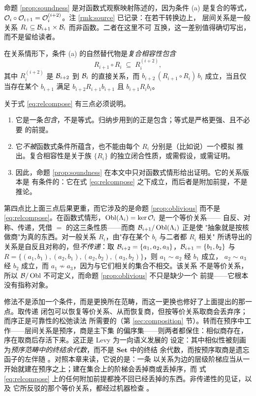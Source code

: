 \begin{remark}[关系情形下的条件 (a)]\label{rmk:relational-compose}
命题 \ref{prop:soundness} 是对函数式观察映射陈述的，因为条件 (a) 是复合的等式，
$\mathcal{O}_i \circ \mathcal{O}_{i+1} = \mathcal{O}_i^{(i+2)}$。注 \ref{rmk:source} 已记录：在若干转换边上，
层间关系是一般关系 $R_i \subseteq \mathcal{B}_{i+1} \times \mathcal{B}_i$ 而非函数。二者在这里不可
互换，这一差别值得确切写出，而不是留给读者。

在关系情形下，条件 (a) 的自然替代物是\emph{复合相容性包含}
\begin{equation}\label{eq:relcompose}
R_{i+1} \circ R_i \;\subseteq\; R_i^{(i+2)},
\end{equation}
其中 $R_i^{(i+2)}$ 是 $\mathcal{B}_{i+2}$ 到 $\mathcal{B}_i$ 的直接关系，而
$b_{i+2}\,(R_{i+1} \circ R_i)\,b_i$ 成立，当且仅当存在某个 $b_{i+1}$ 满足
$b_{i+2} R_{i+1} b_{i+1}$ 且 $b_{i+1} R_i b_i$。

关于式 \eqref{eq:relcompose} 有三点必须说明。
\begin{enumerate}[label=(\alph*)]
\item 它是一条\emph{包含}，不是等式。归纳步用到的正是包含；等式是严格更强、且不必要
      的前提。
\item 它\emph{不被}函数式条件所蕴含，也不能由每个 $R_i$ 分别是（比如说）一个模拟
      推出。复合相容性是关于族 $\{R_i\}$ 的独立闭合性质，或需假设，或需证明。
\item 因此，命题 \ref{prop:soundness} 在本文中只对函数式情形给出证明。它的关系版本是
      有条件的：它在式 \eqref{eq:relcompose} 之下成立，而后者是附加前提，不是推论。
\end{enumerate}

第四点比上面三点后果更重，而它涉及的是命题 \ref{prop:oblivious} 而不是
\eqref{eq:relcompose}。在函数式情形，$\operatorname{Obl}(\Lambda_i) = \ker\mathcal{O}_i$ 是一个等价关系——
自反、对称、传递，凭借 $=$ 的这三条性质——而商 $\mathcal{B}_{i+1}/\operatorname{Obl}(\Lambda_i)$ 正是使
"抽象就是按核做商"为真的东西。对一般关系 $R_i$，由"存在某个 $b_i$ 与二者都 $R_i$ 相关"
所诱导出的关系是自反且对称的，但\emph{不传递}：取
$\mathcal{B}_{i+2} = \{a_1,a_2,a_3\}$，$\mathcal{B}_{i+1} = \{b_1,b_2\}$ 与
$R = \{(a_1,b_1),(a_2,b_1),(a_2,b_2),(a_3,b_2)\}$，则 $a_1 \sim a_2$ 经 $b_1$ 成立，
$a_2 \sim a_3$ 经 $b_2$ 成立，而 $a_1 \not\sim a_3$，因为与它们相关的集合不相交。该关系
不是等价关系，所以 $\mathcal{B}/\operatorname{Obl}$ 不可定义，而命题 \ref{prop:oblivious} 不只是缺少一个
前提——它根本没有指称对象。

修法不是添加一个条件，而是更换所在范畴，而这一更换也修好了上面提出的那一点。取传递
闭包可以恢复等价关系、从而恢复商，但按等价关系取商会丢弃序；而序正是可靠性的松弛读法
所需要的（第 \ref{sec:composition} 节）。转而在预序中工作——层间关系是预序，商是主下集
的偏序集——则两者都保住：相似商存在，序在取商后存活下来。这正是 Levy 为一向语义发展的
设定：其中相似性被刻画为\emph{预序范畴中的终结余代数}，而不是 $\mathbf{Set}$ 中的终结
余代数，而按预序取商是遗忘函子的左伴随 \cite{levy2011}。对照本章来读，它说的是：一条
以关系为边的层级阶梯应当从一开始就建在预序之上；建在集合上的阶梯会丢掉商或丢掉序，而
式 \eqref{eq:relcompose} 上的任何附加前提都挽不回已经丢掉的东西。非传递性的见证，以及
它所反驳的那个等价关系，都经过机器检查 \cite{assaylean}。


\end{remark}

